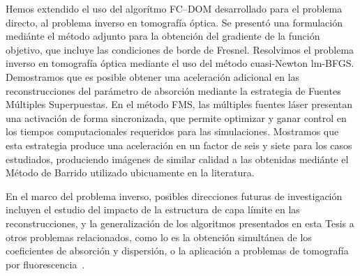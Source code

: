  Hemos extendido el uso del algorítmo FC--DOM desarrollado 
 para el problema directo, al problema inverso en tomografía óptica. 
 Se presentó una formulación mediánte el método adjunto para 
 la obtención del gradiente de la función objetivo, que incluye 
 las condiciones de borde de Fresnel. 
 Resolvimos el problema inverso en tomografía óptica mediante el uso 
 del método cuasi-Newton lm-BFGS.
 Demostramos que es posible obtener una aceleración adicional 
 en las reconstrucciones del parámetro de absorción 
 mediante la estrategia de Fuentes Múltiples Superpuestas. 
En el método FMS, las múltiples fuentes láser presentan una activación de 
 forma sincronizada, que permite optimizar y ganar control en los tiempos computacionales requeridos para las simulaciones. 
 Mostramos que esta estrategia produce una aceleración en un factor de 
 seis y siete para los casos estudiados, produciendo imágenes 
 de similar calidad a las obtenidas mediánte el Método de Barrido 
 utilizado ubicuamente en la literatura. 

 En el marco del problema inverso, posibles direcciones futuras 
 de investigación incluyen el estudio del impacto 
 de la estructura de capa límite en las reconstrucciones, 
 y la generalización de los algoritmos presentados en esta Tesis 
 a otros problemas relacionados, como lo es la obtención 
 simultánea de los coeficientes de absorción y dispersión, 
 o la aplicación a problemas de tomografía por fluorescencia~\cite{Klose2009,Ren2010}.


\pagestyle{empty}
